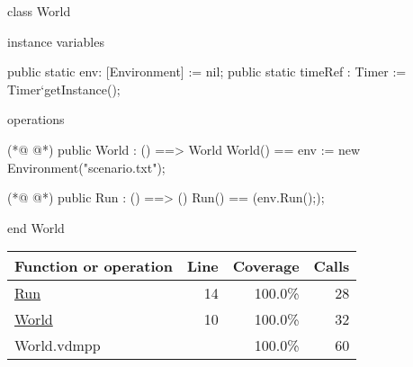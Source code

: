 \begin{vdmpp}[breaklines=true]
class World

instance variables

public static env: [Environment] := nil;
public static timeRef : Timer := Timer`getInstance();

operations

(*@
\label{World:10}
@*)
public World : () ==> World
World() ==
 env := new Environment("scenario.txt");

(*@
\label{Run:14}
@*)
public Run : () ==> ()
Run() ==
 (env.Run(););

end World
\end{vdmpp}
\bigskip
\begin{longtable}{|l|r|r|r|}
\hline
Function or operation & Line & Coverage & Calls \\
\hline
\hline
\hyperref[Run:14]{Run} & 14&100.0\% & 28 \\
\hline
\hyperref[World:10]{World} & 10&100.0\% & 32 \\
\hline
\hline
World.vdmpp & & 100.0\% & 60 \\
\hline
\end{longtable}

